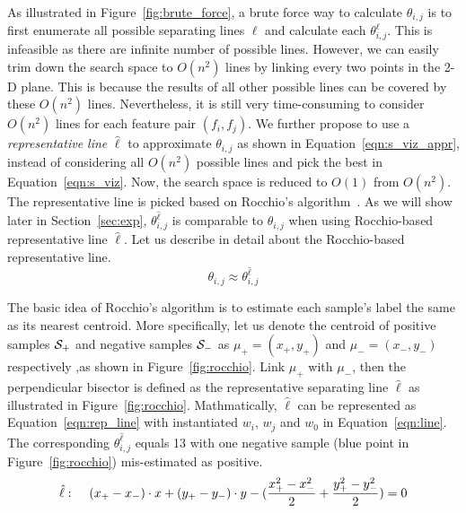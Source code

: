  As illustrated in Figure~\ref{fig:brute_force}, a brute force way to calculate $\theta_{i,j}$ is to first enumerate all possible separating lines $\ell$ and calculate each $\theta_{i,j}^\ell$. This is infeasible as there are infinite number of possible lines. However, we can easily trim down the search space to $O(n^2)$ lines by linking every two points in the 2-D plane. This is because the results of all other possible lines can be covered by these $O(n^2)$ lines. Nevertheless, it is still very time-consuming to consider $O(n^2)$ lines for each feature pair $(f_i,f_j)$. We further propose to use a {\em representative line} $\hat{\ell}$ to approximate $\theta_{i, j}$ as shown in Equation~\ref{eqn:s_viz_appr}, instead of considering all $O(n^2)$ possible lines and pick the best in Equation~\ref{eqn:s_viz}. Now, the search space is reduced to $O(1)$ from $O(n^2)$. The representative line is picked based on Rocchio's algorithm~\cite{rocchio1971relevance}. As we will show later in Section~\ref{sec:exp}, $\theta_{i,j}^{\hat{\ell}}$ is comparable to $\theta_{i,j}$ when using Rocchio-based representative line $\hat{\ell}$. Let us describe in detail about the Rocchio-based representative line.
\begin{equation}\label{eqn:s_viz_appr}
\theta_{i,j}  \approx \theta_{i,j}^{\hat{\ell}}
\end{equation}

 The basic idea of Rocchio's algorithm is to estimate each sample's label the same as its nearest centroid. More specifically, let us denote the centroid of positive samples $\mathcal{S}_+$ and negative samples $\mathcal{S}_-$ as $\mu_+=(x_+,y_+)$ and $\mu_-=(x_-,y_-)$ respectively ,as shown in Figure~\ref{fig:rocchio}. Link $\mu_+$ with $\mu_-$, then the perpendicular bisector is defined as the representative separating line $\hat{\ell}$ as illustrated in Figure~\ref{fig:rocchio}. Mathmatically, $\hat{\ell}$ can be represented as Equation~\ref{eqn:rep_line} with instantiated $w_i$, $w_j$ and $w_0$ in Equation~\ref{eqn:line}. The corresponding $\theta_{i,j}^{\hat{\ell}}$ equals 13 with one negative sample (blue point in Figure~\ref{fig:rocchio}) mis-estimated as positive.
\begin{equation}\label{eqn:rep_line}
\hat{\ell}: \hspace{4mm} (x_+-x_-)\cdot x + (y_+-y_-)\cdot y -(\frac{x_+^2-x_-^2}{2}+\frac{y_+^2-y_-^2}{2}) =0 
\end{equation}

